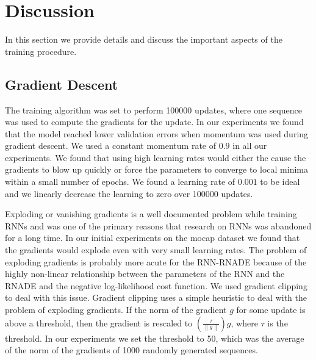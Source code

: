 \documentclass{article} %
\begin{document}
\section{Discussion}
\label{Discussion}
In this section we provide details and discuss the important aspects of the training procedure.
\subsection{Gradient Descent}
 The training algorithm was set to perform 100000 updates, where one sequence was used to compute the gradients for the update. In our experiments we found that the model reached lower validation errors when momentum was used during gradient descent. We used a constant momentum rate of $0.9$ in all our experiments. We found that using high learning rates would either the cause the gradients to blow up quickly or force the parameters to converge to local minima within a small number of epochs. We found a learning rate of $0.001$ to be ideal and we linearly decrease the learning to zero over 100000 updates. 

Exploding or vanishing gradients is a well documented problem while training RNNs and was one of the primary reasons that research on RNNs was abandoned for a long time. In our initial experiments on the mocap dataset we found that the gradients would explode even with very small learning rates. The problem of exploding gradients is probably more acute for the RNN-RNADE because of the highly non-linear relationship between the parameters of the RNN and the RNADE and the negative log-likelihood cost function. We used gradient clipping \cite{bengio2012advances} to deal with this issue. Gradient clipping uses a simple heuristic to deal with the problem of exploding gradients. If the norm of the gradient $g$ for some update is above a threshold, then the gradient is rescaled to $(\frac{\tau}{\left\lVert g \right\rVert})g$, where $\tau$ is the threshold. In our experiments we set the threshold to 50, which was the average of the norm of the gradients of 1000 randomly generated sequences. 
\end{document}
